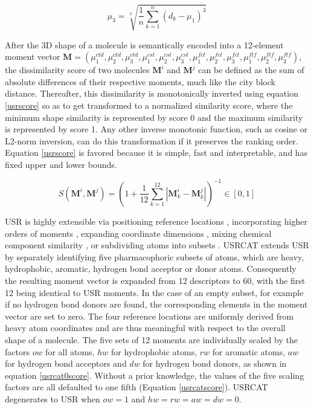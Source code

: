 \documentclass[a4,center,fleqn]{NAR}
\begin{document}
\begin{equation}
\mu_3=\sqrt[3]{\frac{1}{n}\sum_{k=1}^{n}{(d_k-\mu_1)^3}}
\label{moment3}
\end{equation}

After the 3D shape of a molecule is semantically encoded into a 12-element moment vector $\mathbf M=(\mu_1^{ctd}, \mu_2^{ctd}, \mu_3^{ctd}, \mu_1^{cst}, \mu_2^{cst}, \mu_3^{cst}, \mu_1^{fct}, \mu_2^{fct}, \mu_3^{fct}, \mu_1^{ftf}, \mu_2^{ftf}, \mu_3^{ftf})$, the dissimilarity score of two molecules $\mathbf M^i$ and $\mathbf M^j$ can be defined as the sum of absolute differences of their respective moments, much like the city block distance. Thereafter, this dissimilarity is monotonically inverted using equation \eqref{usrscore} so as to get transformed to a normalized similarity score, where the minimum shape similarity is represented by score 0 and the maximum similarity is represented by score 1. Any other inverse monotonic function, such as cosine or L2-norm inversion, can do this transformation if it preserves the ranking order. Equation \eqref{usrscore} is favored because it is simple, fast and interpretable, and has fixed upper and lower bounds.

\begin{equation}
S(\mathbf M^i, \mathbf M^j)=(1+\frac{1}{12}\sum_{k=1}^{12}|\mathbf M_k^i-\mathbf M_k^j|)^{-1}\in[0, 1]
\label{usrscore}
\end{equation}

USR \cite{1379} is highly extensible via positioning reference locations \cite{1334,1335}, incorporating higher orders of moments \cite{1333,1337}, expanding coordinate dimensions \cite{1337,1338}, mixing chemical component similarity \cite{1333,1407,1408}, or subdividing atoms into subsets \cite{1436,1331}. USRCAT \cite{1331} extends USR \cite{1379} by separately identifying five pharmacophoric subsets of atoms, which are heavy, hydrophobic, aromatic, hydrogen bond acceptor or donor atoms. Consequently the resulting moment vector is expanded from 12 descriptors to 60, with the first 12 being identical to USR moments. In the case of an empty subset, for example if no hydrogen bond donors are found, the corresponding elements in the moment vector are set to zero. The four reference locations are uniformly derived from heavy atom coordinates and are thus meaningful with respect to the overall shape of a molecule. The five sets of 12 moments are individually scaled by the factors $ow$ for all atoms, $hw$ for hydrophobic atoms, $rw$ for aromatic atoms, $aw$ for hydrogen bond acceptors and $dw$ for hydrogen bond donors, as shown in equation \eqref{usrcat0score}. Without a prior knowledge, the values of the five scaling factors are all defaulted to one fifth (Equation \eqref{usrcatscore}). USRCAT degenerates to USR when $ow=1$ and $hw=rw=aw=dw=0$.
\end{document}
